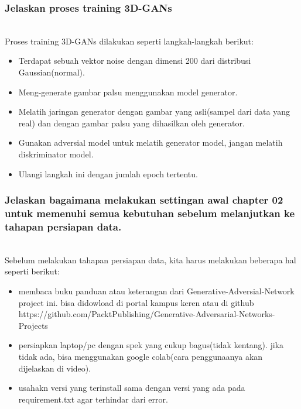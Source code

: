 \subsubsection{Jelaskan proses training 3D-GANs}
\hfill\\
Proses training 3D-GANs dilakukan seperti langkah-langkah berikut:
\begin{itemize}
	\item Terdapat sebuah vektor noise dengan dimensi 200 dari distribusi Gaussian(normal).
	\item Meng-generate gambar palsu menggunakan model generator.
	\item Melatih jaringan generator dengan gambar yang asli(sampel dari data yang real) dan dengan gambar palsu yang dihasilkan oleh generator.
	\item Gunakan adversial model untuk melatih generator model, jangan melatih diskriminator model.
	\item Ulangi langkah ini dengan jumlah epoch tertentu.
\end{itemize}


\subsubsection{Jelaskan bagaimana melakukan settingan awal chapter 02 untuk memenuhi semua kebutuhan sebelum melanjutkan ke tahapan persiapan data.}
\hfill\\
Sebelum melakukan tahapan persiapan data, kita harus melakukan beberapa hal seperti berikut:
\begin{itemize}
	\item membaca buku panduan atau keterangan dari Generative-Adversial-Network project ini. bisa didowload di portal kampus keren atau di github https://github.com/PacktPublishing/Generative-Adversarial-Networks-Projects
	\item persiapkan laptop/pc dengan spek yang cukup bagus(tidak kentang). jika tidak ada, bisa menggunakan google colab(cara penggunaanya akan dijelaskan di video).
	\item usahakn versi yang terinstall sama dengan versi yang ada pada requirement.txt agar terhindar dari error.
\end{itemize}


